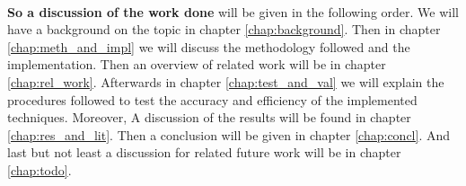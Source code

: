 	\paragraph{}
	\textbf{So a discussion of the work done} will be given in the following order. We will have a background on the topic in chapter \ref{chap:background}. Then in chapter \ref{chap:meth_and_impl} we will discuss the methodology followed and the implementation. Then an overview of related work will be in chapter \ref{chap:rel_work}. Afterwards in chapter \ref{chap:test_and_val} we will explain the procedures followed to test the accuracy and efficiency of the implemented techniques. Moreover, A discussion of the results will be found in chapter \ref{chap:res_and_lit}. Then a conclusion will be given in chapter \ref{chap:concl}. And last but not least a discussion for related future work will be in chapter \ref{chap:todo}. 
